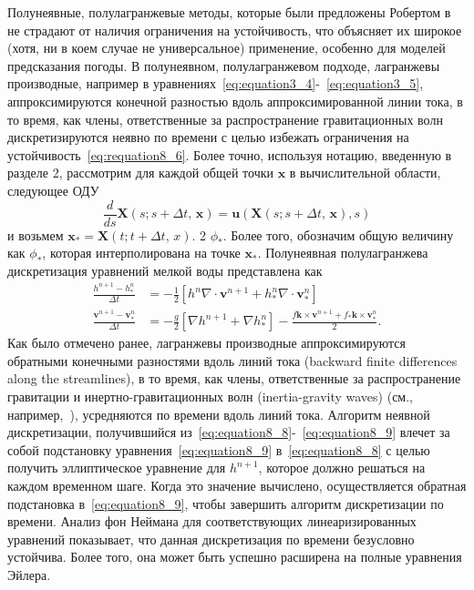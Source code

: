 Полунеявные, полулагранжевые методы, которые были предложены Робертом в~\cite{A60} не страдают от наличия ограничения на устойчивость, что объясняет их широкое (хотя, ни в коем случае не универсальное) применение, особенно для моделей предсказания погоды. В полунеявном, полулагранжевом подходе, лагранжевы производные, например в уравнениях~\eqref{eq:equation3_4}-~\eqref{eq:equation3_5}, аппроксимируются конечной разностью вдоль аппроксимированной линии тока, в то время, как члены, ответственные за распространение гравитационных волн дискретизируются неявно по времени с целью избежать ограничения на устойчивость~\eqref{eq:requation8_6}. Более точно, используя нотацию, введенную в разделе 2, рассмотрим для каждой общей точки $\mathbf{x}$ в вычислительной области, следующее ОДУ
% 
\begin{equation}
\label{eq:equation8_7}
\frac{d}{ds}\mathbf{X}(s;s+\Delta t,\,\mathbf{x})=\mathbf{u}(\mathbf{X}(s;s+\Delta t,\,\mathbf{x}), s)
\end{equation}
%
и возьмем $\mathbf{x}_{*}=\mathbf{X}(t; t + \Delta t,\,x).$ 2 $\phi_*$. Более того, обозначим общую величину как $\phi_*$, которая интерполирована на точке $\mathbf{x}_*$. Полунеявная полулагранжева дискретизация уравнений мелкой воды представлена как
%
\begin{align}
\label{eq:equation8_8}
\frac{h^{n+1}-h_{*}^n}{\Delta t}&=-\frac{1}{2} [h^n\nabla \cdot \mathbf{v}^{n+1} + h_*^n \nabla \cdot \mathbf{v}_{*}^n] \\
\label{eq:equation8_9}
\frac{\mathbf{v}^{n+1}-\mathbf{v}_{*}^n}{\Delta t}&=-\frac{g}{2}[\nabla h^{n+1}+\nabla h_{*}^n] - \frac{f\mathbf{k}\times\mathbf{v}^{n+1}+f_{*}\mathbf{k}\times\mathbf{v}_{*}^n}{2}.
\end{align}
%
Как было отмечено ранее, лагранжевы производные аппроксимируются обратными конечными разностями вдоль линий тока (backward finite differences along the streamlines), в то время, как члены, ответственные за распространение гравитации и инертно-гравитационных волн (inertia-gravity waves) (см., например,~\cite{A49}), усредняются по времени вдоль линий тока. Алгоритм неявной дискретизации, получившийся из~\eqref{eq:equation8_8}-~\eqref{eq:equation8_9} влечет за собой подстановку уравнения~\eqref{eq:equation8_9} в~\eqref{eq:equation8_8} с целью получить эллиптическое уравнение для $h^{n+1}$, которое должно решаться на каждом временном шаге. Когда это значение вычислено, осуществляется обратная подстановка в~\eqref{eq:equation8_9}, чтобы завершить алгоритм дискретизации по времени. Анализ фон Неймана для соответствующих линеаризированных уравнений показывает, что данная дискретизация по времени безусловно устойчива. Более того, она может быть успешно расширена на полные уравнения Эйлера.
